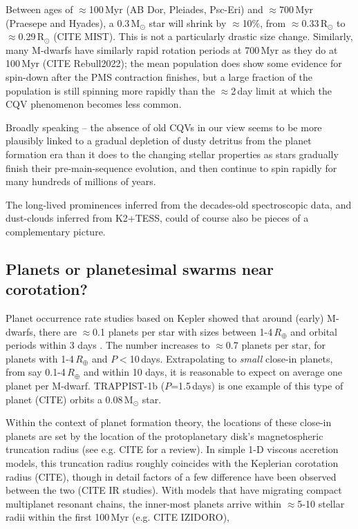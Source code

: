 \documentclass[11pt,twocolumn,tighten]{aastex63}
\begin{document}
Between ages of $\approx$100\,Myr (AB Dor, Pleiades, Psc-Eri) and
$\approx$700\,Myr (Praesepe and Hyades), a 0.3\,M$_\odot$ star will
shrink by $\approx$10\%, from $\approx$0.33\,R$_\odot$ to 
$\approx$0.29\,R$_\odot$ (CITE MIST).
This is not a particularly drastic size change.
Similarly, many M-dwarfs  have similarly rapid rotation periods 
at 700\,Myr as they do at 100\,Myr (CITE Rebull2022); 
the mean population does show some evidence for spin-down after the
PMS contraction finishes, but a large fraction of the population is
still spinning more rapidly than the $\approx$2\,day limit at which
the CQV phenomenon becomes less common.

Broadly speaking -- the absence of old CQVs in our view seems to be
more plausibly linked to a gradual depletion of dusty detritus from the
planet formation era than it does to the changing stellar properties
as stars gradually finish their pre-main-sequence evolution, and then
continue to spin rapidly for many hundreds of millions of years.

The long-lived prominences inferred from the decades-old spectroscopic
data, and dust-clouds inferred from K2+TESS, could of course also be
pieces of a complementary picture.


\subsection{Planets or planetesimal swarms near corotation?}

Planet occurrence rate studies based on Kepler showed that around
(early) M-dwarfs, there are $\approx$0.1 planets per star with sizes
between 1-4\,$R_\oplus$ and orbital periods within 3 days
\citep{2015ApJ...807...45D}.  The number increases to $\approx$0.7
planets per star, for planets with 1-4\,$R_\oplus$ and $P$$<$10\,days.
Extrapolating to {\it small} close-in planets, from say
0.1-4\,$R_\oplus$ and within 10 days, it is reasonable to expect on
average one planet per M-dwarf.  TRAPPIST-1b ($P$=1.5\,days) is one
example of this type of planet (CITE) orbits a 0.08\,M$_\odot$ star.

Within the context of planet formation theory, the locations of these
close-in planets are set by the location of the protoplanetary disk's
magnetospheric truncation radius (see e.g. CITE for a review).  In
simple 1-D viscous accretion models, this truncation radius roughly
coincides with the Keplerian corotation radius (CITE), though in
detail factors of a few difference have been observed between the two
(CITE IR studies).  With models that have migrating compact
multiplanet resonant chains, the inner-most planets arrive within
$\approx$5-10 stellar radii within the first 100\,Myr (e.g.  CITE
IZIDORO),
\end{document}
